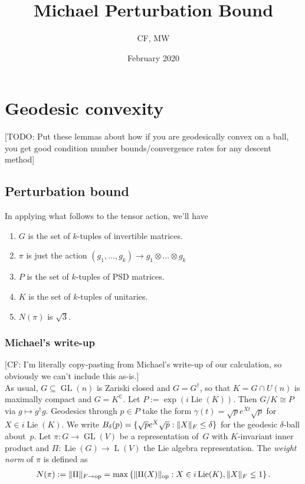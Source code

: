 \documentclass{article}
\title{Michael Perturbation Bound}
\author{CF, MW}
\date{February 2020}
\DeclareMathOperator{\Lie}{Lie}
\DeclareMathOperator{\Lin}{L}
\DeclareMathOperator{\ope}{op}
\DeclarePairedDelimiter{\norm}{\lVert}{\rVert}
\newcommand{\ot}{\otimes}
\newcommand\GL{\operatorname{GL}}
\newcommand{\CF}[1]{{\color{purple}[CF: #1]}}
\newcommand{\TODO}[1]{{\color{blue}[TODO: #1]}}
\begin{document}
\maketitle


\section{Geodesic convexity}\label{sec:g-convex}
\TODO{Put these lemmas about how if you are geodesically convex on a ball, you get good condition number bounds/convergence rates for any descent method}

\subsection{Perturbation bound}
In applying what follows to the tensor action, we'll have
\begin{enumerate}
\item $G$ is the set of $k$-tuples of invertible matrices. 
\item $\pi$ is just the action $(g_1, \dots, g_k) \to g_1 \ot \dots \ot g_k$
\item $P$ is the set of $k$-tuples of PSD matrices.
\item $K$ is the set of $k$-tuples of unitaries.
\item $N(\pi)$ is $\sqrt{3}$.
\end{enumerate}




\subsubsection{Michael's write-up}
\CF{I'm literally copy-pasting from Michael's write-up of our calculation, so obviously we can't include this as-is.}\\
As usual, $G \subseteq \GL(n)$ is Zariski closed and $G = G^\dagger$, so that $K = G \cap U(n)$ is maximally compact and $G = K^{\mathbb C}$.
Let $P := \exp(i\Lie(K))$. Then $G/K \cong P$ via $g \mapsto g^\dagger g$.
Geodesics through $p\in P$ take the form $\gamma(t) = \sqrt p e^{Xt} \sqrt p$ for $X\in i\Lie(K)$.
We write $B_\delta(p) = \{ \sqrt p e^X \sqrt p : \norm{X}_F \leq \delta \}$ for the geodesic $\delta$-ball about~$p$.
Let $\pi\colon G \to \GL(V)$ be a representation of~$G$ with $K$-invariant inner product and $\Pi\colon\Lie(G)\to\Lin(V)$ the Lie algebra representation.
The \emph{weight norm} of $\pi$ is defined as
\begin{align*}
  N(\pi) := \norm{\Pi}_{F\to\ope} = \max \left\{ \norm{\Pi(X)}_{\ope} : X \in i\Lie(K), \norm{X}_F \leq 1 \right\}.
\end{align*}
\end{document}
